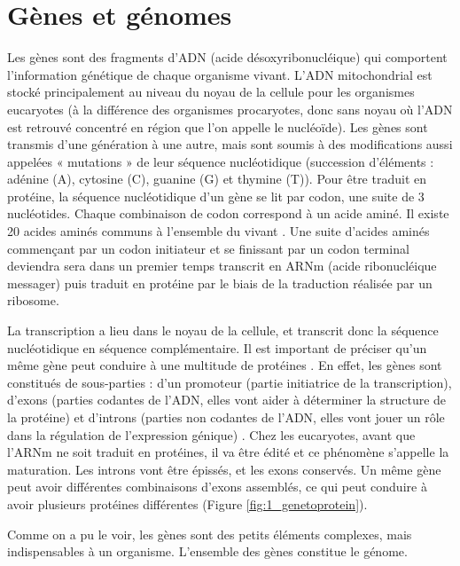 \section{Gènes et génomes}\label{genes}
\par Les gènes sont des fragments d’ADN (acide désoxyribonucléique) qui comportent l’information génétique de chaque organisme vivant. L’ADN mitochondrial est stocké principalement au niveau du noyau de la cellule pour les organismes eucaryotes (à la différence des organismes procaryotes, donc sans noyau où l’ADN est retrouvé concentré en région que l’on appelle le nucléoïde). Les gènes sont transmis d’une génération à une autre, mais sont soumis à des modifications aussi appelées « mutations » de leur séquence nucléotidique (succession d’éléments : adénine (A), cytosine (C), guanine (G) et thymine (T)). Pour être traduit en protéine, la séquence nucléotidique d’un gène se lit par codon, une suite de 3 nucléotides. Chaque combinaison de codon correspond à un acide aminé. Il existe 20 acides aminés communs à l’ensemble du vivant \parencite{ambrogelly_natural_2007}. Une suite d’acides aminés commençant par un codon initiateur et se finissant par un codon terminal deviendra sera dans un premier temps transcrit en ARNm (acide ribonucléique messager) puis traduit en protéine par le biais de la traduction réalisée par un ribosome.
\par La transcription a lieu dans le noyau de la cellule, et transcrit donc la séquence nucléotidique en séquence complémentaire. Il est important de préciser qu’un même gène peut conduire à une multitude de protéines \parencite{breathnach_organization_1981}. En effet, les gènes sont constitués de sous-parties : d’un promoteur (partie initiatrice de la transcription), d’exons (parties codantes de l’ADN, elles vont aider à déterminer la structure de la protéine) et d’introns (parties non codantes de l’ADN, elles vont jouer un rôle dans la régulation de l’expression génique) \parencite{keren_alternative_2010, shaul_how_2017}. Chez les eucaryotes, avant que l’ARNm ne soit traduit en protéines, il va être édité et ce phénomène s’appelle la maturation. Les introns vont être épissés, et les exons conservés. Un même gène peut avoir différentes combinaisons d’exons assemblés, ce qui peut conduire à avoir plusieurs protéines différentes (Figure \ref{fig:1_genetoprotein}).
\par Comme on a pu le voir, les gènes sont des petits éléments complexes, mais indispensables à un organisme. L’ensemble des gènes constitue le génome. 

